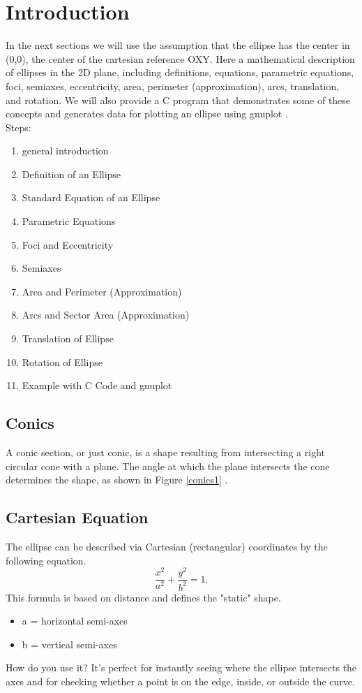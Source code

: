 \documentclass[a4paper,10pt]{article}
\begin{document}
\section{Introduction}
In the next sections we will use the assumption that the ellipse has the center in (0,0), the center of the cartesian reference OXY.
Here a mathematical description of ellipses in the 2D plane, including definitions, equations, parametric equations, foci, semiaxes, eccentricity, area, perimeter (approximation), arcs, translation, and rotation. We will also provide a C program that demonstrates some of these concepts and generates data for plotting an ellipse using gnuplot \cite{gnuplotJ16} .\\
Steps:\\
\begin{enumerate}
\item general introduction
\item Definition of an Ellipse
\item Standard Equation of an Ellipse
\item Parametric Equations
\item Foci and Eccentricity
\item Semiaxes
\item Area and Perimeter (Approximation)
\item Arcs and Sector Area (Approximation)
\item Translation of Ellipse
\item Rotation of Ellipse
\item Example with C Code and gnuplot
\end{enumerate}
\subsection{Conics}
A conic section, or just conic, is a shape resulting from intersecting a right circular cone with a plane. The angle at which the plane intersects the cone determines the shape, as shown in Figure \ref{conics1} .\\
\subsection{Cartesian Equation}
The ellipse can be described via Cartesian (rectangular) coordinates by the following equation.
\[  \frac{x^2}{a^2}+\frac{y^2}{b^2}=1. \]
This formula is based on distance and defines the "static" shape.
\begin{itemize}
 \item a = horizontal semi-axes
 \item b = vertical semi-axes
\end{itemize}
How do you use it? It's perfect for instantly seeing where the ellipse intersects the axes and for checking whether a point is on the edge, inside, or outside the curve.
\end{document}

